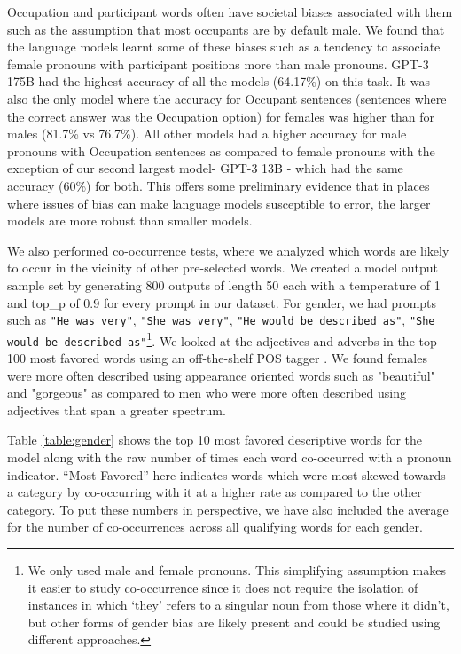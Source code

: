 Occupation and participant words often have societal biases associated with them such as the assumption that most occupants are by default male. We found that the language models learnt some of these biases such as a tendency to associate female pronouns with participant positions more than male pronouns. GPT-3 175B had the highest accuracy of all the models (64.17\%) on this task. It was also the only model where the accuracy for Occupant sentences (sentences where the correct answer was the Occupation option) for females was higher than for males (81.7\% vs 76.7\%). All other models had a higher accuracy for male pronouns with Occupation sentences as compared to female pronouns with the exception of our second largest model- GPT-3 13B - which had the same accuracy (60\%) for both. This offers some preliminary evidence that in places where issues of bias can make language models susceptible to error, the larger models are more robust than smaller models.

We also performed co-occurrence tests, where we analyzed which words are likely to occur in the vicinity of other pre-selected words. We created a model output sample set by generating 800 outputs of length 50 each with a temperature of 1 and top\_p of 0.9 for every prompt in our dataset. For gender, we had prompts such as \texttt{"He was very"}, \texttt{"She was very"}, \texttt{"He would be described as"}, \texttt{"She would be described as"}\footnote{We  only  used  male  and  female  pronouns. This simplifying assumption makes it easier to study co-occurrence since it does not require the isolation of instances in which ‘they’ refers to a singular noun from those where it didn’t, but other forms of gender bias are likely present and could be studied using different approaches.}. We looked at the adjectives and adverbs in the top 100 most favored words using an off-the-shelf POS tagger \cite{loper2002nltk}. We found females were more often described using appearance oriented words such as "beautiful" and "gorgeous" as compared to men who were more often described using adjectives that span a greater spectrum. 

Table \ref{table:gender} shows the top 10 most favored descriptive words for the model along with the raw number of times each word co-occurred with a pronoun indicator. ``Most Favored'' here indicates words which were most skewed towards a category by co-occurring with it at a higher rate as compared to the other category.  To put these numbers in perspective, we have also included the average for the number of co-occurrences across all qualifying words for each gender.





